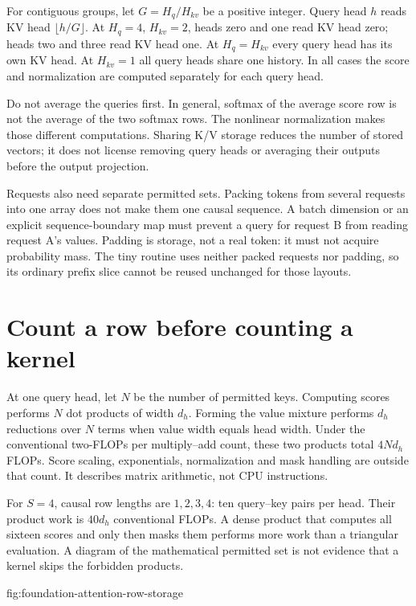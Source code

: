 For contiguous groups, let $G=H_q/H_{kv}$ be a positive integer.
Query head $h$ reads KV head $\lfloor h/G\rfloor$. At $H_q=4$,
$H_{kv}=2$, heads zero and one read KV head zero; heads two and three
read KV head one. At $H_q=H_{kv}$ every query head has its own KV head.
At $H_{kv}=1$ all query heads share one history. In all cases the score
and normalization are computed separately for each query head.

Do not average the queries first. In general, softmax of the average
score row is not the average of the two softmax rows. The nonlinear
normalization makes those different computations. Sharing K/V storage
reduces the number of stored vectors; it does not license removing query
heads or averaging their outputs before the output projection.

Requests also need separate permitted sets. Packing tokens from several
requests into one array does not make them one causal sequence.
A batch dimension or an explicit sequence-boundary map must prevent a
query for request B from reading request A's values. Padding is storage,
not a real token: it must not acquire probability mass. The tiny routine
uses neither packed requests nor padding, so its ordinary prefix slice
cannot be reused unchanged for those layouts.

\section{Count a row before counting a kernel}
At one query head, let $N$ be the number of permitted keys.
Computing scores performs $N$ dot products of width $d_h$.
Forming the value mixture performs $d_h$ reductions over $N$ terms
when value width equals head width. Under the conventional two-FLOPs
per multiply--add count, these two products total $4Nd_h$ FLOPs.
Score scaling, exponentials, normalization and mask handling are outside
that count. It describes matrix arithmetic, not CPU instructions.

For $S=4$, causal row lengths are $1,2,3,4$: ten query--key pairs
per head. Their product work is $40d_h$ conventional FLOPs.
A dense product that computes all sixteen scores and only then masks
them performs more work than a triangular evaluation. A diagram of the
mathematical permitted set is not evidence that a kernel skips the
forbidden products.

{fig:foundation-attention-row-storage}

